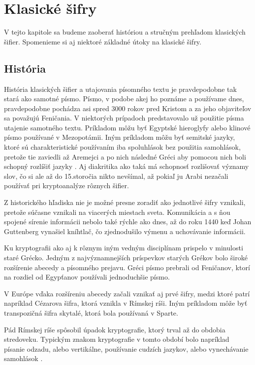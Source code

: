 \section{Klasické šifry}
V tejto kapitole sa budeme zaoberať históriou a stručným prehľadom klasických šifier.
Spomenieme si aj niektoré základné útoky na klasické šifry. 

\subsection{História}
História klasických šifier a utajovania písomného textu je pravdepodobne tak stará ako samotné písmo.
Písmo, v podobe akej ho poznáme a používame dnes, pravdepodobne pochádza asi spred 3000 rokov pred Kristom a za jeho objaviteľov sa považujú
Feničania.
V niektorých prípadoch predstavovalo už použitie písma utajenie samotného textu.
Príkladom môžu byť Egyptské hieroglyfy alebo klinové písmo používané v Mezopotámii.
Iným príkladom môžu byť semitské jazyky, ktoré sú charakteristické používaním iba spoluhlások bez použitia samohlások,
pretože tie zaviedli až Aremejci a po nich následné Gréci aby pomocou nich boli schopný rozlíšiť jazyky \cite{ks}.
Aj diakritika ako taká má schopnosť rozlišovať významy slov, čo si ale až do 15.storočia nikto nevšímal,
až pokiaľ ju Arabi nezačali používať pri kryptoanalýze rôznych šifier.

Z historického hľadiska nie je možné presne zoradiť ako jednotlivé šifry vznikali, pretože súčasne vznikali na viacerých miestach sveta.
Komunikácia a s ňou spojené sírenie informácii nebolo také rýchle ako dnes, až do roku 1440 keď Johan Guttenberg vynašiel kníhtlač,
čo zjednodušilo výmenu a uchovávanie informácii.

Ku kryptografii ako aj k rôznym iným vedným disciplínam prispelo v minulosti staré Grécko.
Jedným z najvýznamnejších príspevkov starých Grékov bolo široké rozšírenie abecedy a písomného prejavu.
Gréci písmo prebrali od Feničanov, ktorí na rozdiel od Egypťanov používali jednoduchšie písmo.

V Európe vďaka rozšíreniu abecedy začali vznikať aj prvé šifry, medzi ktoré patrí napríklad Cézarova šifra, ktorá vznikla v Rímskej ríši.
Iným príkladom môže byť transpozičná šifra skytalé, ktorá bola používaná v Sparte.

Pád Rímskej ríše spôsobil úpadok kryptografie, ktorý trval až do obdobia stredoveku. Typickým znakom kryptografie v tomto období bolo
napríklad písanie odzadu, alebo vertikálne, používanie cudzích jazykov, alebo vynechávanie samohlások \cite{ks}.

